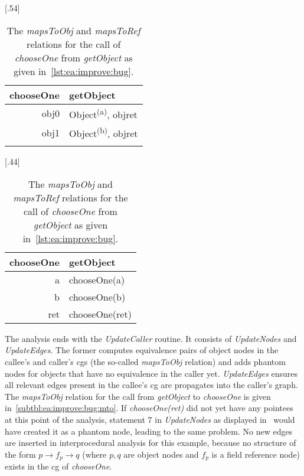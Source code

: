 			\begin{table}
				\centering
				{%
						\centering%
						\begin{tabular}{rl}
							\textbf{chooseOne} & \textbf{getObject} \\\hline\hline
							obj0 & Object\textsuperscript{(a)}, objret\\
							obj1 & Object\textsuperscript{(b)}, objret\\ \\
						\end{tabular}%
				}%
				\hspace{\fill}%
				{%
						\centering%
						\begin{tabular}{rl}
							\textbf{chooseOne} & \textbf{getObject} \\\hline\hline
							a   & chooseOne(a)\\
							b   & chooseOne(b)\\
							ret & chooseOne(ret)
						\end{tabular}%
				}%
				\caption[%
					The \emph{mapsToObj} and \emph{mapsToRef} relations for the call of \emph{chooseOne} from \emph{getObject}]{%
					The \emph{mapsToObj} and \emph{mapsToRef} relations for the call of \emph{chooseOne} from \emph{getObject} as
					given in~\cref{lst:ea:improve:bug}.}
				\label{tbl:ea:improve:bug:mapsTo}
			\end{table}

			The analysis ends with the \emph{UpdateCaller} routine. It consists of \emph{UpdateNodes} and \emph{UpdateEdges}.
			The former computes equivalence pairs of object nodes in the callee's and caller's \glspl{cg} (the so-called
			\emph{mapsToObj} relation) and adds phantom nodes for objects that have no equivalence in the caller yet.
			\emph{UpdateEdges} ensures all relevant edges present in the callee's \gls{cg} are propagates into the caller's
			graph. The \emph{mapsToObj} relation for the call from \emph{getObject} to \emph{chooseOne} is given
			in~\cref{subtbl:ea:improve:bug:mto}. If \emph{chooseOne(ret)} did not yet have any pointees at this point of the
			analysis, statement 7 in \emph{UpdateNodes} as displayed in~\cite[Fig.~7]{choi:03:toplas} would have created it as
			a phantom node, leading to the same problem. No new edges are inserted in interprocedural analysis for this
			example, because no structure of the form $p \rightarrow f_p \rightarrow q$ (where $p, q$ are object nodes and
			$f_p$ is a field reference node) exists in the \gls{cg} of \emph{chooseOne}.

